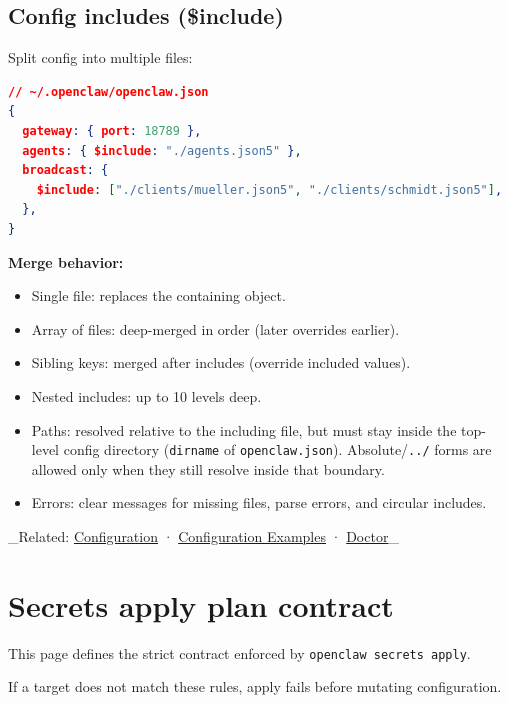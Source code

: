 \hrulefill


\subsection{Config includes (\$include)}


Split config into multiple files:

\begin{lstlisting}[language=json]
// ~/.openclaw/openclaw.json
{
  gateway: { port: 18789 },
  agents: { $include: "./agents.json5" },
  broadcast: {
    $include: ["./clients/mueller.json5", "./clients/schmidt.json5"],
  },
}
\end{lstlisting}


\textbf{Merge behavior:}

\begin{itemize}
  \item Single file: replaces the containing object.
  \item Array of files: deep-merged in order (later overrides earlier).
  \item Sibling keys: merged after includes (override included values).
  \item Nested includes: up to 10 levels deep.
  \item Paths: resolved relative to the including file, but must stay inside the top-level config directory (\texttt{dirname} of \texttt{openclaw.json}). Absolute/\texttt{../} forms are allowed only when they still resolve inside that boundary.
  \item Errors: clear messages for missing files, parse errors, and circular includes.
\end{itemize}


\hrulefill


\_Related: \href{/gateway/configuration}{Configuration} · \href{/gateway/configuration-examples}{Configuration Examples} · \href{/gateway/doctor}{Doctor}\_


\clearpage

\section{Secrets apply plan contract}


This page defines the strict contract enforced by \texttt{openclaw secrets apply}.

If a target does not match these rules, apply fails before mutating configuration.

